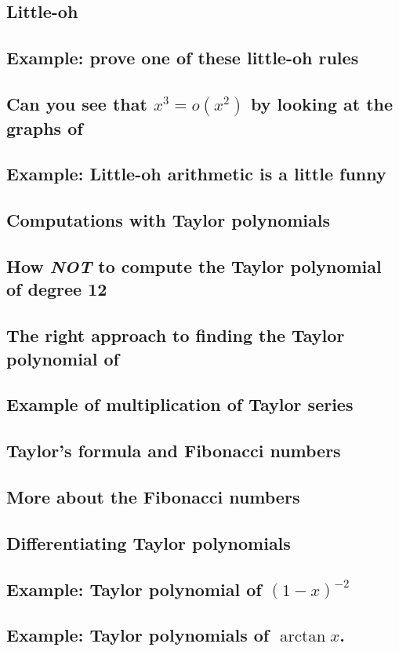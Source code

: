 \subsection{Little-oh}
\subsection{Example: prove one of these little-oh rules}
\subsection{Can you see that $x^3=o (x^2)$ by looking at the graphs of}
\subsection{Example: Little-oh arithmetic is a little funny}
\subsection{Computations with Taylor polynomials}
\subsection{How \textit{NOT} to compute the Taylor polynomial of degree 12}
\subsection{The right approach to finding the Taylor polynomial of}
\subsection{Example of multiplication of Taylor series}
\subsection{Taylor's formula and Fibonacci numbers}
\subsection{More about the Fibonacci numbers}
\subsection{Differentiating Taylor polynomials}
\subsection{Example: Taylor polynomial of $(1-x)^{-2}$}
\subsection{Example: Taylor polynomials of $\arctan x$. }
